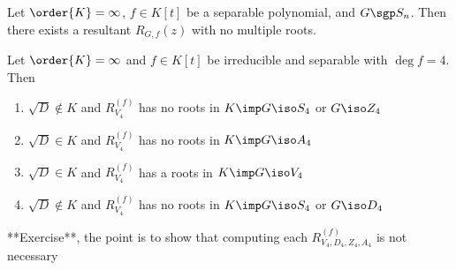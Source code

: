 \documentclass[a4paper]{article}
\begin{document}
\begin{ttheorem}
  Let \( \order{K}=\infty \), \( f\in K[t] \) be a separable polynomial, and \( G\sgp S_n \).
  Then there exists a resultant \( R_{G,f} (z) \) with no multiple roots.
\end{ttheorem}

\begin{ttheorem}
  Let \( \order{K} = \infty \) and \( f\in K[t] \) be irreducible and separable with \( \deg f = 4 \).
  Then \begin{enumerate}
    \item \( \sqrt D \not\in K\) and \( R_{V_4}^{(f)} \) has no roots in \( K \imp G\iso S_4 \) or \( G\iso Z_4 \)
    \item \( \sqrt D \in K\) and \( R_{V_4}^{(f)} \) has no roots in \( K \imp G\iso A_4 \)
    \item \( \sqrt D \in K\) and \( R_{V_4}^{(f)} \) has a roots in \( K \imp G\iso V_4 \)
    \item \( \sqrt D \not\in K\) and \( R_{V_4}^{(f)} \) has no roots in \( K \imp G\iso S_4 \) or \( G\iso D_4 \)
  \end{enumerate}
  **Exercise**, the point is to show that computing each \( R^{(f)}_{V_4,D_4,Z_4,A_4} \) is not necessary
\end{ttheorem}
\end{document}
